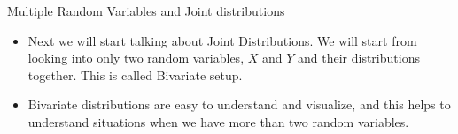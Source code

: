 \documentclass[8pt, usepdftitle=false]{beamer}
\begin{document}
\begin{frame}[allowframebreaks]{Multiple Random Variables and Joint distributions}
\begin{itemize}
\begin{itemize}
\begin{itemize}
      \item The household income of this family (this is a random variable $X_2$).

      \item The household expenditure of this family (this is a random variable $X_3$).
    \end{itemize}

   $X_1$, $X_2$ and $X_3$ are all random variables, and it is natural that they are all related to each other.

   \item 2. Two or more stock prices - Maybe we can represent a stock price of a company with $X_1$, and a stock price of another company with $X_2$, and often different stock prices move up and down together!


   \item We will see more examples in the coming section.
  \end{itemize}

  \item Next we will start talking about Joint Distributions. We will start from looking into only two random variables, $X$ and $Y$ and their distributions together. This is called \alert{Bivariate setup}. 

  \item Bivariate distributions are easy to understand and visualize, and this helps to understand situations when we have more than two random variables.
\end{itemize}




\end{frame}




\end{document}
